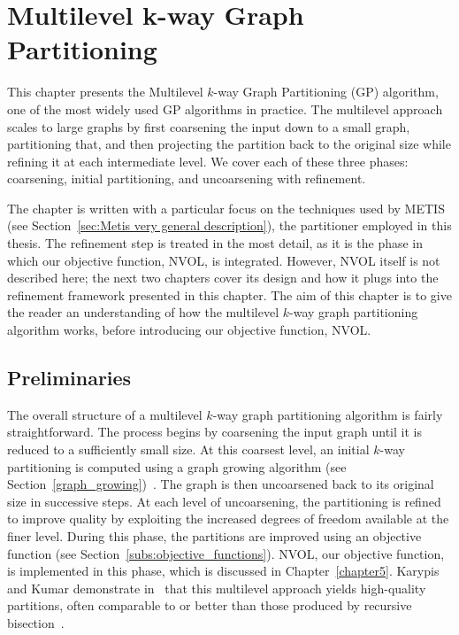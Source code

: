 \chapter{Multilevel k-way Graph Partitioning}\label{chap:multilevel-kway}
This chapter presents the Multilevel $k$-way Graph Partitioning (GP) algorithm, one of the most widely used GP algorithms in practice. The multilevel approach scales to large graphs by first coarsening the input down to a small graph, partitioning that, and then projecting the partition back to the original size while refining it at each intermediate level. We cover each of these three phases: coarsening, initial partitioning, and uncoarsening with refinement. 

The chapter is written with a particular focus on the techniques used by METIS (see Section~\ref{sec:Metis very general description}), the partitioner employed in this thesis. The refinement step is treated in the most detail, as it is the phase in which our objective function, NVOL, is integrated. However, NVOL itself is not described here; the next two chapters cover its design and how it plugs into the refinement framework presented in this chapter. The aim of this chapter is to give the reader an understanding of how the multilevel $k$-way graph partitioning algorithm works, before introducing our objective function, NVOL. 

\section{Preliminaries}
The overall structure of a multilevel $k$-way graph partitioning algorithm is fairly straightforward. The process begins by coarsening the input graph until it is reduced to a sufficiently small size. At this coarsest level, an initial $k$-way partitioning is computed using
a graph growing algorithm (see Section~\ref{graph_growing})~\cite{KarypisGeorge1998AFaH}. The graph is then uncoarsened back to its original size in successive steps. At each level of uncoarsening, the partitioning is refined to improve quality by exploiting the increased degrees of freedom available at the finer level. During this phase, the partitions are improved using an objective function (see Section~\ref{subs:objective_functions}). NVOL, our objective function, is implemented in this phase, which is discussed in Chapter~\ref{chapter5}. Karypis and Kumar demonstrate in~\cite{karypis_multilevelk-way_1998} that this multilevel approach yields high-quality partitions, often comparable to or better than those produced by recursive bisection~\cite{KarypisGeorge1998AFaH}.


